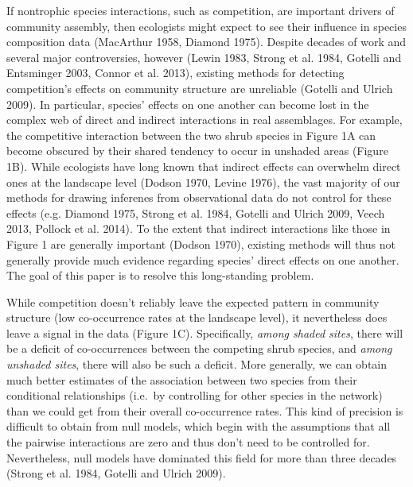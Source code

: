 \documentclass[12pt,]{article}
\begin{document}
\begin{spacing}{1.9}
\begin{flushleft}
If nontrophic species interactions, such as competition, are important
drivers of community assembly, then ecologists might expect to see their
influence in species composition data (MacArthur 1958, Diamond 1975).
Despite decades of work and several major controversies, however (Lewin
1983, Strong et al. 1984, Gotelli and Entsminger 2003, Connor et al.
2013), existing methods for detecting competition's effects on community
structure are unreliable (Gotelli and Ulrich 2009). In particular,
species' effects on one another can become lost in the complex web of
direct and indirect interactions in real assemblages. For example, the
competitive interaction between the two shrub species in Figure 1A can
become obscured by their shared tendency to occur in unshaded areas
(Figure 1B). While ecologists have long known that indirect effects can
overwhelm direct ones at the landscape level (Dodson 1970, Levine 1976),
the vast majority of our methods for drawing inferenes from
observational data do not control for these effects (e.g. Diamond 1975,
Strong et al. 1984, Gotelli and Ulrich 2009, Veech 2013, Pollock et al.
2014). To the extent that indirect interactions like those in Figure 1
are generally important (Dodson 1970), existing methods will thus not
generally provide much evidence regarding species' direct effects on one
another. The goal of this paper is to resolve this long-standing
problem.

While competition doesn't reliably leave the expected pattern in
community structure (low co-occurrence rates at the landscape level), it
nevertheless does leave a signal in the data (Figure 1C). Specifically,
\emph{among shaded sites}, there will be a deficit of co-occurrences
between the competing shrub species, and \emph{among unshaded sites},
there will also be such a deficit. More generally, we can obtain much
better estimates of the association between two species from their
conditional relationships (i.e.~by controlling for other species in the
network) than we could get from their overall co-occurrence rates. This
kind of precision is difficult to obtain from null models, which begin
with the assumptions that all the pairwise interactions are zero and
thus don't need to be controlled for. Nevertheless, null models have
dominated this field for more than three decades (Strong et al. 1984,
Gotelli and Ulrich 2009).


\end{flushleft}
\end{spacing}
\end{document}
